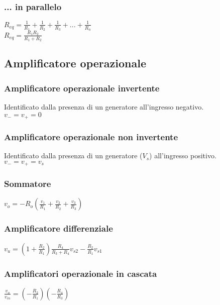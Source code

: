 \documentclass[12pt]{article}
\begin{document}
\subsubsection{... in parallelo}
$R_{eq} = \frac{1}{R_1}+\frac{1}{R_2}+\frac{1}{R_3}+...+\frac{1}{R_n}$
\\$R_{eq} = \frac{R_1R_2}{R_1+R_2}$
\subsection{Amplificatore operazionale}
\subsubsection{Amplificatore operazionale invertente}
Identificato dalla presenza di un generatore all'ingresso negativo.
\\$v_{-} = v_{+} = 0$
\subsubsection{Amplificatore operazionale non invertente}
Identificato dalla presenza di un generatore ($V_s$) all'ingresso positivo.
\\$v_{-} = v_{+} = v_s$
\subsubsection{Sommatore}
$v_o = -R_o\left(\frac{v_1}{R_1}+\frac{v_2}{R_2}+\frac{v_3}{R_3}\right)$
\subsubsection{Amplificatore differenziale}
$v_u= \left(1+\frac{R_2}{R_1}\right)\frac{R_4}{R_3+R_4}v_{s2}-\frac{R_2}{R_1}v_{s1}$
\subsubsection{Amplificatori operazionale in cascata}
$\frac{v_o}{v_{in}}=\left(-\frac{R_2}{R_1}\right)\left(-\frac{R_4}{R_3}\right)$
\end{document}
